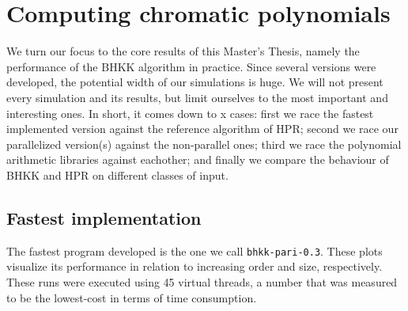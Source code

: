 \documentclass{cslthse-msc}
\newcommand{\code}{\texttt}
\begin{document}
\section{Computing chromatic polynomials}
We turn our focus to the core results of this Master's Thesis, namely the performance of the BHKK algorithm in practice. Since several versions were developed, the potential width of our simulations is huge. We will not present every simulation and its results, but limit ourselves to the most important and interesting ones. In short, it comes down to x cases: first we race the fastest implemented version against the reference algorithm of HPR; second we race our parallelized version(s) against the non-parallel ones; third we race the polynomial arithmetic libraries against eachother; and finally we compare the behaviour of BHKK and HPR on different classes of input.

\subsection{Fastest implementation}\label{fastest}
The fastest program developed is the one we call \code{bhkk-pari-0.3}. These plots visualize its performance in relation to increasing order and size, respectively. These runs were executed using 45 virtual threads, a number that was measured to be the lowest-cost in terms of time consumption.
\end{document}
